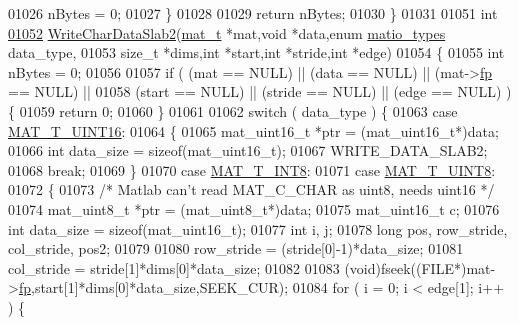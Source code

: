 \begin{DoxyCode}
{{{{01026             nBytes = 0;
01027     \}
01028 
01029     \textcolor{keywordflow}{return} nBytes;
01030 \}
01031 
01051 \textcolor{keywordtype}{int}
\hyperlink{mat5_8c_a5afeaabef5e10f73a5805ce6de4acc8b}{01052} \hyperlink{mat5_8c_a5afeaabef5e10f73a5805ce6de4acc8b}{WriteCharDataSlab2}(\hyperlink{struct__mat__t}{mat\_t} *mat,\textcolor{keywordtype}{void} *data,\textcolor{keyword}{enum} \hyperlink{group___m_a_t_gacf7b3b879282b7ab3a51190e49bf3453}{matio\_types} data\_type,
01053     \textcolor{keywordtype}{size\_t} *dims,\textcolor{keywordtype}{int} *start,\textcolor{keywordtype}{int} *stride,\textcolor{keywordtype}{int} *edge)
01054 \{
01055     \textcolor{keywordtype}{int} nBytes = 0;
01056 
01057     \textcolor{keywordflow}{if} ( (mat   == NULL) || (data   == NULL) || (mat->\hyperlink{struct__mat__t_a85f562e407ca9ad4d2a6e14f839432b7}{fp} == NULL) ||
01058          (start == NULL) || (stride == NULL) || (edge    == NULL) ) \{
01059         \textcolor{keywordflow}{return} 0;
01060     \}
01061 
01062     \textcolor{keywordflow}{switch} ( data\_type ) \{
01063         \textcolor{keywordflow}{case} \hyperlink{group___m_a_t_ggacf7b3b879282b7ab3a51190e49bf3453a05bc7af7680aa68be95126ae0a4c2e31}{MAT\_T\_UINT16}:
01064         \{
01065             mat\_uint16\_t *ptr = (mat\_uint16\_t*)data;
01066             \textcolor{keywordtype}{int} data\_size = \textcolor{keyword}{sizeof}(mat\_uint16\_t);
01067             WRITE\_DATA\_SLAB2;
01068             \textcolor{keywordflow}{break};
01069         \}
01070         \textcolor{keywordflow}{case} \hyperlink{group___m_a_t_ggacf7b3b879282b7ab3a51190e49bf3453a9807f5033ed4f9b548953742d9fd1658}{MAT\_T\_INT8}:
01071         \textcolor{keywordflow}{case} \hyperlink{group___m_a_t_ggacf7b3b879282b7ab3a51190e49bf3453a01c1bd7db68f90552862eb5d311be408}{MAT\_T\_UINT8}:
01072         \{
01073             \textcolor{comment}{/* Matlab can't read MAT\_C\_CHAR as uint8, needs uint16 */}
01074             mat\_uint8\_t *ptr = (mat\_uint8\_t*)data;
01075             mat\_uint16\_t c;
01076             \textcolor{keywordtype}{int} data\_size = \textcolor{keyword}{sizeof}(mat\_uint16\_t);
01077             \textcolor{keywordtype}{int} i, j;
01078             \textcolor{keywordtype}{long} pos, row\_stride, col\_stride, pos2;
01079 
01080             row\_stride = (stride[0]-1)*data\_size;
01081             col\_stride = stride[1]*dims[0]*data\_size;
01082 
01083             (void)fseek((FILE*)mat->\hyperlink{struct__mat__t_a85f562e407ca9ad4d2a6e14f839432b7}{fp},start[1]*dims[0]*data\_size,SEEK\_CUR);
01084             \textcolor{keywordflow}{for} ( i = 0; i < edge[1]; i++ ) \{
}}}}
\end{DoxyCode}
